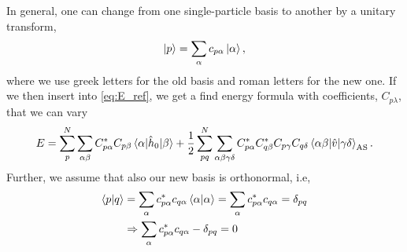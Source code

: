 In general, one can change from one single-particle basis to another by a unitary transform,
\begin{equation}
\ket{p}=\sum_{\alpha}c_{p\alpha}\ket{\alpha},
\end{equation}
where we use greek letters for the old basis and roman letters for the new one. If we then insert into \eqref{eq:E_ref}, we get a find energy formula with coefficients, $C_{p\lambda}$, that we can vary
\begin{equation}
E=\sum_{p}^N\sum_{\alpha\beta}C_{p\alpha}^*C_{p\beta}\mel{\alpha}{\hat{h}_0}{\beta}+\frac{1}{2}
\sum_{pq}^N\sum_{\alpha\beta\gamma\delta}C_{p\alpha}^*C_{q\beta}^*C_{p\gamma}C_{q\delta}\mel{\alpha\beta}{\hat{v}}{\gamma\delta}_{\text{AS}}.
\end{equation}
Further, we assume that also our new basis is orthonormal, i.e,
\begin{align}
\braket{p}{q}&=\sum_{\alpha}c_{p\alpha}^*c_{q\alpha}\braket{\alpha}{\alpha}=\sum_{\alpha}c_{p\alpha}^*c_{q\alpha}=\delta_{pq}\\
&\Rightarrow\sum_{\alpha}c_{p\alpha}^*c_{q\alpha}-\delta_{pq}=0\label{eq:constraint}
\end{align}

